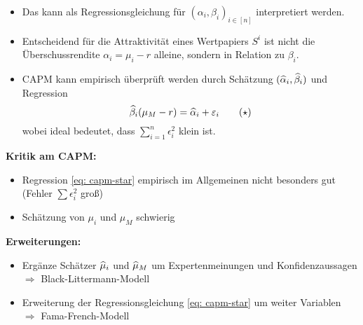 \begin{itemize}
	\begin{itemize}[nolistsep]
		\item Das kann als Regressionsgleichung für $(\alpha_i, \beta_i)_{i \in [n]}$ interpretiert werden.
		\item  Entscheidend für die Attraktivität eines Wertpapiers $S^i$ ist nicht die Überschussrendite $\alpha_i = \mu_i - r$ alleine, sondern in Relation zu $\beta_i$.
		\item CAPM kann empirisch überprüft werden durch Schätzung $(\widehat{\alpha}_i, \widehat{\beta}_i)$ und Regression
		\begin{equation*}
			\widehat{\beta}_i (\mu_M - r) = \widehat{\alpha}_i + \varepsilon_i
			\tag{$\star$} \label{eq: capm-star}
		\end{equation*}
		wobei ideal bedeutet, dass $\sum_{i=1}^n \epsilon_i^2$ klein ist.
	\end{itemize}
\end{itemize}

\textbf{Kritik am CAPM:}
\begin{itemize}[nolistsep, topsep=-\parskip]
	\item Regression \eqref{eq: capm-star} empirisch im Allgemeinen nicht besonders gut (Fehler $\sum \epsilon_i^2$ groß)
	\item Schätzung von $\mu_i$ und $\mu_M$ schwierig
\end{itemize}

\vspace{\parskip}

\textbf{Erweiterungen:}
\begin{itemize}[nolistsep, topsep=-\parskip]
	\item Ergänze Schätzer $\widehat{\mu}_i$ und $\widehat{\mu}_M$ um Expertenmeinungen und Konfidenzaussagen \\
	$\Rightarrow$ Black-Littermann-Modell
	\item Erweiterung der Regressionsgleichung \eqref{eq: capm-star} um weiter Variablen \\
	$\Rightarrow$ Fama-French-Modell
\end{itemize}